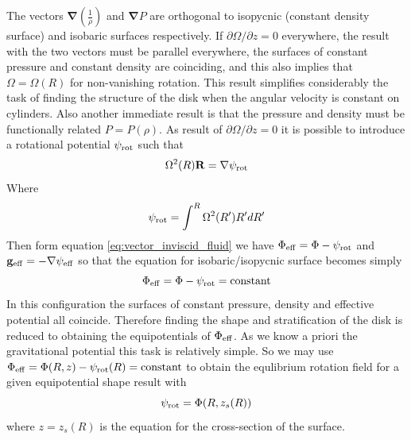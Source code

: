 \documentclass[modern]{aastex62}
\renewcommand{\vec}[1]{\mathbf{#1}}
\begin{document}
The vectors $ \vec\nabla\left(\frac{1}{\rho}\right)$ and $\vec\nabla P$ are orthogonal to isopycnic (constant density surface) and isobaric surfaces respectively.
If $\partial \Omega/ \partial z=0$ everywhere, the result with the two vectors must be parallel everywhere, the surfaces of constant pressure and constant density are coinciding, and this also implies that $\Omega=\Omega(R)$ for non-vanishing rotation. This result simplifies considerably the task of finding the structure of the disk when the angular velocity is constant on cylinders. Also another immediate result is that the pressure and density must be functionally related $P=P(\rho)$.
As result of $\partial \Omega/ \partial z=0$ it is possible to introduce a rotational potential $\psi_{\rm{rot}}$ such that
\begin{equation}
\Omega^2(R)\vec R = \vec \nabla \psi_{\rm{rot}}
\end{equation}
Where 
\begin{equation}
\psi_{\rm{rot}} = \int^R  \Omega^2(R') R' d R'
\end{equation}
Then form equation \ref{eq:vector_inviscid_fluid} we have $\Phi_{\rm{eff}}=\Phi-\psi_{\rm{rot}}$ and $\vec g_{\rm{eff}} = -\vec \nabla \psi_{\rm{eff}}$ so that the equation for isobaric/isopycnic surface becomes simply 
\begin{equation}\label{eq:phi_eff_constant}
\Phi_{\rm{eff}}=\Phi-\psi_{\rm{rot}}=\rm{constant}
\end{equation}
In this configuration the surfaces of constant pressure, density and effective potential all coincide. Therefore finding the shape and stratification of the disk is reduced to obtaining the equipotentials of $\Phi_{\rm{eff}}$. As we know a priori the gravitational potential this task is relatively simple. So we may use $\Phi_{\rm{eff}}=\Phi(R,z)-\psi_{\rm{rot}}(R)=\rm{constant}$ to obtain the equlibrium rotation field for a given equipotential shape result with
\begin{equation}\label{eq:rotation_potantial}
    \psi_{\rm{rot}}=\Phi(R,z_s(R))
\end{equation}
where $z=z_s(R)$ is the equation for the cross-section of the surface.
\end{document}

